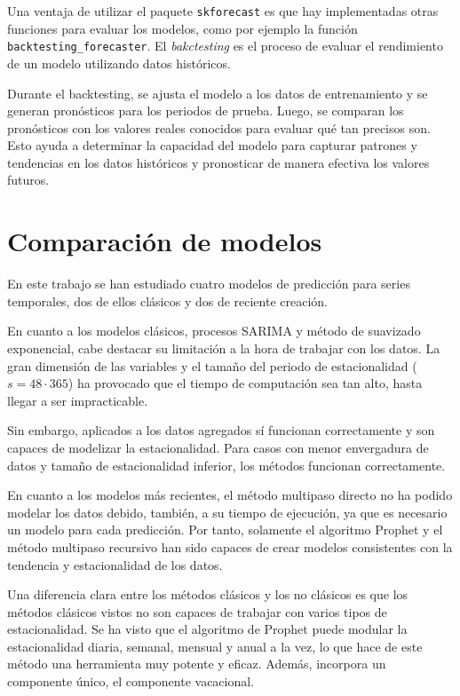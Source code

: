 \documentclass[12pt,twoside]{article}
\begin{document}
Una ventaja de utilizar el paquete \texttt{skforecast} es que hay implementadas otras funciones para evaluar los modelos, como por ejemplo la función \texttt{backtesting\_forecaster}. El \emph{bakctesting} es el proceso de evaluar el rendimiento de un modelo utilizando datos históricos.

Durante el backtesting, se ajusta el modelo a los datos de entrenamiento y se generan pronósticos para los periodos de prueba. Luego, se comparan los pronósticos con los valores reales conocidos para evaluar qué tan precisos son. Esto ayuda a determinar la capacidad del modelo para capturar patrones y tendencias en los datos históricos y pronosticar de manera efectiva los valores futuros.








\newpage
\section{Comparación de modelos}
En este trabajo se han estudiado cuatro modelos de predicción para series temporales, dos de ellos clásicos y dos de reciente creación.

En cuanto a los modelos clásicos, procesos SARIMA y método de suavizado exponencial, cabe destacar su limitación a la hora de trabajar con los datos. La gran dimensión de las variables y el tamaño del periodo de estacionalidad ($s=48\cdot 365$) ha provocado que el tiempo de computación sea tan alto, hasta llegar a ser impracticable.

Sin embargo, aplicados a los datos agregados sí funcionan correctamente y son capaces de modelizar la estacionalidad. Para casos con menor envergadura de datos y tamaño de estacionalidad inferior, los métodos funcionan correctamente.

En cuanto a los modelos más recientes, el método multipaso directo no ha podido modelar los datos debido, también, a su tiempo de ejecución, ya que es necesario un modelo para cada predicción. Por tanto, solamente el algoritmo Prophet y el método multipaso recursivo han sido capaces de crear modelos consistentes con la tendencia y estacionalidad de los datos.

Una diferencia clara entre los métodos clásicos y los no clásicos es que los métodos clásicos vistos no son capaces de trabajar con varios tipos de estacionalidad. Se ha visto que el algoritmo de Prophet puede modular la estacionalidad diaria, semanal, mensual y anual a la vez, lo que hace de este método una herramienta muy potente y eficaz. Además, incorpora un componente único, el componente vacacional.
\end{document}
